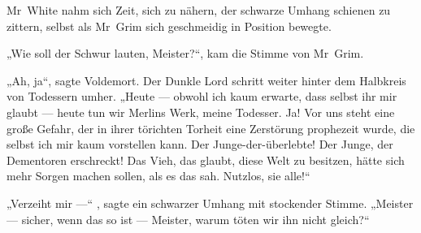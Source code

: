 Mr~White nahm sich Zeit, sich zu nähern, der schwarze Umhang schienen zu zittern, selbst als Mr~Grim sich geschmeidig in Position bewegte.

„Wie soll der Schwur lauten, Meister?“, kam die Stimme von Mr~Grim.

„Ah, ja“, sagte Voldemort. Der Dunkle Lord schritt weiter hinter dem Halbkreis von Todessern umher.
„Heute — obwohl ich kaum erwarte, dass selbst ihr mir glaubt — heute tun wir Merlins Werk, meine Todesser. Ja! Vor uns steht eine große Gefahr, der in ihrer törichten Torheit eine Zerstörung prophezeit wurde, die selbst ich mir kaum vorstellen kann. Der Junge-der-überlebte! Der Junge, der Dementoren erschreckt! Das Vieh, das glaubt, diese Welt zu besitzen, hätte sich mehr Sorgen machen sollen, als es das sah. Nutzlos, sie alle!“

„Verzeiht mir —“ , sagte ein schwarzer Umhang mit stockender Stimme.
„Meister — sicher, wenn das so ist — Meister, warum töten wir ihn nicht gleich?“

